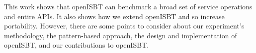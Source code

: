 This work shows that openISBT can benchmark a broad set of service operations and entire APIs. It also shows how we extend openISBT and so increase portability. However, there are some points to consider about our experiment's methodology, the pattern-based approach, the design and implementation of openISBT, and our contributions to openISBT. 